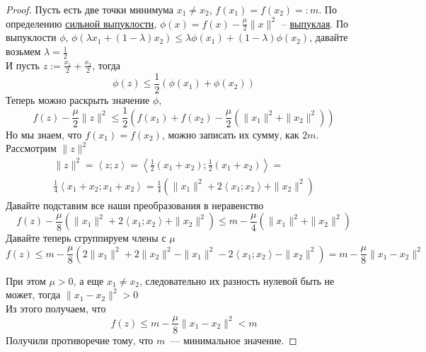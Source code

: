 \begin{proof}
  Пусть есть две точки минимума $x_1 \ne x_2$, $f(x_1) = f(x_2) =: m$.
  По определению \hyperref[note:22E546FC-186F-4A67-85AA-2C85DCEF9021]{сильной выпуклости}, $\phi(x) = f(x) - \frac{\mu}{2} \| x \|^2$  -- \hyperref[note:1CA14F2C-637F-41DE-9E97-72075D19E97F]{выпуклая}.
  По выпуклости $\phi$, $\phi(\lambda x_1 + (1-\lambda)x_2) \le \lambda \phi(x_1) + (1-\lambda) \phi(x_2)$, давайте возьмем $\lambda=\frac{1}{2}$ \\
  И пусть $z := \frac{x_1}{2} + \frac{x_2}{2}$, тогда
  \[
  \phi(z) \le \frac{1}{2} (\phi(x_1) + \phi(x_2))
  \]
  Теперь можно раскрыть значение $\phi$,
  \[
  f(z) - \frac{\mu}{2} \| z \|^2 \le \frac{1}{2} \left(  f(x_1) + f(x_2) - \frac{\mu}{2} (\| x_1\|^2 + \| x_2 \|^2)  \right)
  \]
  Но мы знаем, что $f(x_1) = f(x_2)$, можно записать их сумму, как $2m$.
  Рассмотрим $\|z\|^2$
  \begin{multline*}
  \| z\|^2 = \left\langle z; z \right\rangle = \left\langle \frac{1}{2} (x_1 + x_2); \frac{1}{2} (x_1 + x_2) \right\rangle = \\
  \frac{1}{4} \left\langle x_1 + x_2; x_1 + x_2 \right\rangle =
  \frac{1}{4} \left( \| x_1 \|^2 + 2 \left\langle x_1; x_2 \right\rangle +\| x_2 \|^2 \right)
  \end{multline*}
  Давайте подставим все наши преобразования в неравенство
  \[
  f(z) - \frac{\mu}{8} (\| x_1 \|^2 + 2 \left\langle x_1; x_2 \right\rangle +\| x_2 \|^2) \le m - \frac{\mu}{4} (\|x_1\|^2 + \|x_2\|^2)
  \]
  Давайте теперь сгруппируем члены с $\mu$
  \[
  f(z) \le m - \frac{\mu}{8} (2 \| x_1\|^2 + 2\|x_2\|^2 - \|x_1\|^2 - 2 \left\langle x_1;x_2 \right\rangle - \| x_2 \|^2) = m - \frac{\mu}{8} \| x_1 - x_2 \|^{2}
  \]

  При этом $\mu > 0$, а еще $x_1 \ne x_2$, следовательно их разность нулевой быть не может, тогда $\| x_1 - x_2 \|^2 > 0$ \\
  Из этого получаем, что
  \[
  f(z) \le m - \frac{\mu}{8} \| x_1 - x_2 \|^{2} < m
  \]
  Получили противоречие тому, что $m$~--- минимальное значение.
\end{proof}

